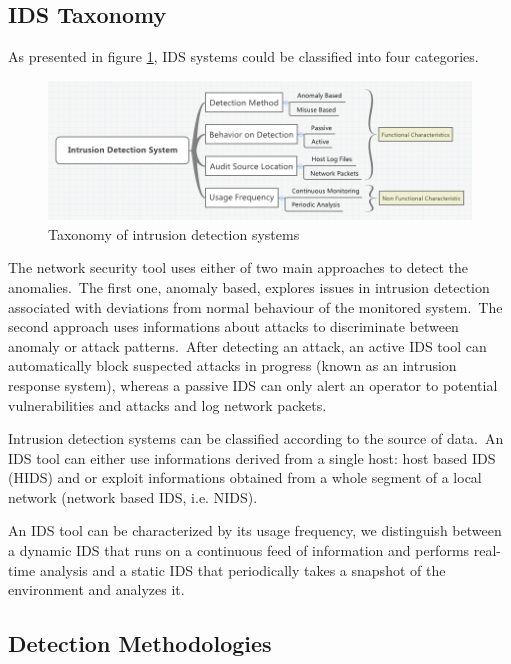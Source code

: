 		\subsection{IDS Taxonomy}

			As presented in figure \ref{Taxonomy of intrusion detection systems}, IDS systems could be classified into four categories.

			\begin{figure}[h!]
				\centering
				\includegraphics[scale=0.45]{figures/Taxonomy.png}
				\caption{Taxonomy of intrusion detection systems}
				\label{Taxonomy of intrusion detection systems} 	
			\end{figure}
				
			The network security tool uses either of two main approaches to detect the anomalies.\ The first one, anomaly based, explores issues in intrusion detection associated with deviations from normal behaviour of the monitored system.\ The second approach uses informations about attacks to discriminate between anomaly or attack patterns.\ After detecting an attack, an active IDS tool can automatically block suspected attacks in progress (known as an intrusion response system), whereas a passive IDS can only alert an operator to potential vulnerabilities and attacks and log network packets.

	
			Intrusion detection systems can be classified according to the source of data.\ An IDS tool can either use informations derived from a single host: host based IDS (HIDS) and or exploit informations obtained from a whole segment of a local network (network based IDS, i.e. NIDS).


			An IDS tool can be characterized by its usage frequency, we distinguish between a dynamic IDS that runs on a continuous feed of information and performs real-time analysis and a static IDS that periodically takes a snapshot of the environment and analyzes it.


		\subsection{Detection Methodologies}

